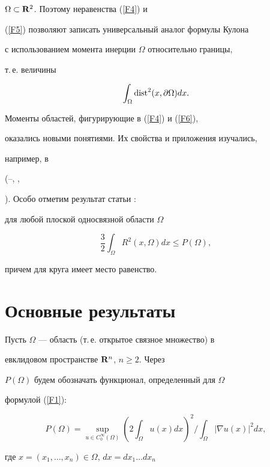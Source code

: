 $\Omega\subset{\bold R}^2$. Поэтому неравенства (\ref{F4}) и


(\ref{F5}) позволяют записать универсальный аналог формулы Кулона


с использованием момента инерции $\Omega$ относительно границы,


т.\,е. величины


\begin{equation} \label{F6}


\int_\Omega \dist^2(x,\partial\Omega)dx.


\end{equation}


Моменты областей, фигурирующие  в (\ref{F4}) и (\ref{F6}),


оказались новыми понятиями. Их свойства и приложения изучались,


например, в


(\cite{l3}--\cite{l6}, \cite{l9}, 


\cite{l10}). Особо отметим результат статьи \cite{l10}:


для любой плоской односвязной области $\Omega$


$$


\frac{3}{2}\int_\Omega R^2(x,\Omega)dx \leq P(\Omega),


$$


причем для круга имеет место равенство.








\section{Основные результаты}





Пусть $\Omega$ --- область (т.\,е. открытое связное множество) в


евклидовом пространстве ${\bold R}^n$, $n\geq 2$. Через


$P(\Omega)$ будем обозначать функционал, определенный для $\Omega$


формулой (\ref{F1}):


$$


P(\Omega)=\sup_{u\in C_0^\infty (\Omega)}\left(2\int_\Omega


u(x) dx \right)^2\Big/\int_\Omega |\nabla u(x)|^2dx,


$$


где $x=(x_1,\dotsc,x_n)\in \Omega$, $dx=dx_1\dotsc dx_n$


